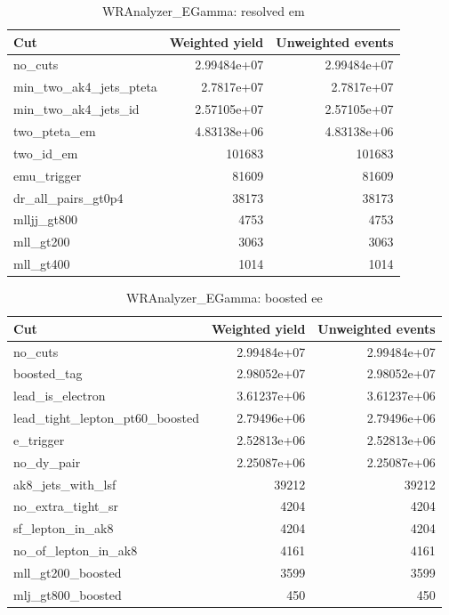 \documentclass{article}
\begin{document}
\begin{table}[htbp]
\centering
\caption{WRAnalyzer\_EGamma: resolved em}
\begin{tabular}{lrr}
\hline
Cut & Weighted yield & Unweighted events \\
\hline
no\_cuts & 2.99484e+07 & 2.99484e+07 \\
min\_two\_ak4\_jets\_pteta & 2.7817e+07 & 2.7817e+07 \\
min\_two\_ak4\_jets\_id & 2.57105e+07 & 2.57105e+07 \\
two\_pteta\_em & 4.83138e+06 & 4.83138e+06 \\
two\_id\_em & 101683 & 101683 \\
emu\_trigger & 81609 & 81609 \\
dr\_all\_pairs\_gt0p4 & 38173 & 38173 \\
mlljj\_gt800 & 4753 & 4753 \\
mll\_gt200 & 3063 & 3063 \\
mll\_gt400 & 1014 & 1014 \\
\hline
\end{tabular}
\end{table}

\begin{table}[htbp]
\centering
\caption{WRAnalyzer\_EGamma: boosted ee}
\begin{tabular}{lrr}
\hline
Cut & Weighted yield & Unweighted events \\
\hline
no\_cuts & 2.99484e+07 & 2.99484e+07 \\
boosted\_tag & 2.98052e+07 & 2.98052e+07 \\
lead\_is\_electron & 3.61237e+06 & 3.61237e+06 \\
lead\_tight\_lepton\_pt60\_boosted & 2.79496e+06 & 2.79496e+06 \\
e\_trigger & 2.52813e+06 & 2.52813e+06 \\
no\_dy\_pair & 2.25087e+06 & 2.25087e+06 \\
ak8\_jets\_with\_lsf & 39212 & 39212 \\
no\_extra\_tight\_sr & 4204 & 4204 \\
sf\_lepton\_in\_ak8 & 4204 & 4204 \\
no\_of\_lepton\_in\_ak8 & 4161 & 4161 \\
mll\_gt200\_boosted & 3599 & 3599 \\
mlj\_gt800\_boosted & 450 & 450 \\
\hline
\end{tabular}
\end{table}
\end{document}
